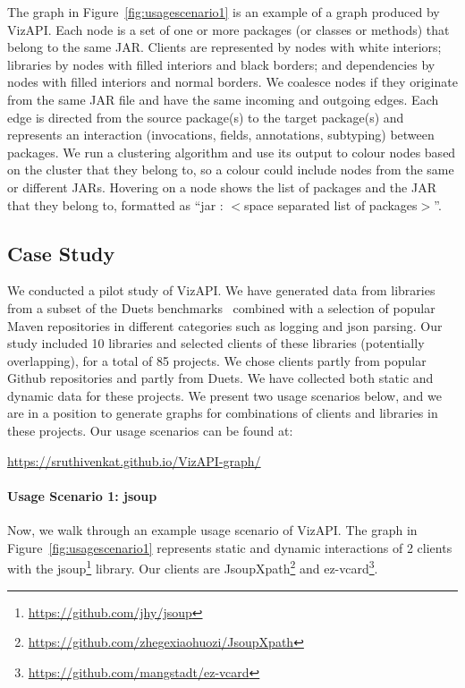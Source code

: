 The graph in Figure~\ref{fig:usagescenario1}
is an example of a graph produced by VizAPI.
Each node is a set of one or more packages (or classes or methods) 
that belong to the same JAR. 
Clients are represented by nodes with white interiors; libraries by nodes with filled interiors and black borders;
and dependencies by nodes with filled interiors and normal borders.
We coalesce nodes if they originate from the same 
JAR file and have the same incoming and outgoing edges. Each edge is directed 
from the source package(s) to the target package(s) and represents an interaction 
(invocations, fields, annotations, subtyping) between packages. We run a 
clustering algorithm and use its output to colour nodes based on the cluster 
that they belong to, so a colour could include nodes from the same or different JARs.
Hovering on a node shows the list of packages and 
the JAR that they belong to, 
formatted as “jar : $<$space separated list of packages$>$”.

\subsection{Case Study}
\label{subsec:evaluation}

We conducted a pilot study of VizAPI.
We have generated data from libraries from a subset of the
Duets benchmarks~\cite{durieux21} combined with a selection of
popular Maven repositories 
in different categories such as logging and json parsing.
Our study included 10 libraries and
selected clients of these libraries (potentially overlapping), for a total of 85 projects.
We chose clients partly
from popular Github repositories and partly from Duets.
We have collected both static and dynamic data for these projects.
We present two usage scenarios below, and we are in a position
to generate graphs for combinations of clients and libraries
in these projects. Our usage scenarios can be found at:
\begin{center}
\url{https://sruthivenkat.github.io/VizAPI-graph/}
\end{center}

\paragraph{Usage Scenario 1: jsoup}
Now, we walk through an example usage scenario of VizAPI.
The graph in Figure~\ref{fig:usagescenario1} represents static and dynamic interactions of 2 clients with the jsoup\footnote{\url{https://github.com/jhy/jsoup}\label{jsoup}} library. Our clients are JsoupXpath\footnote{\url{https://github.com/zhegexiaohuozi/JsoupXpath}\label{jsoupxpath}} and ez-vcard\footnote{\url{https://github.com/mangstadt/ez-vcard}\label{ez-vcard}}.


